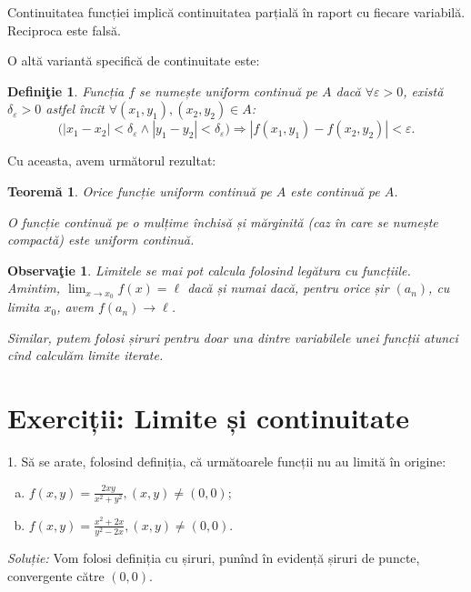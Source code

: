 \documentclass[11pt,a4paper]{article}
\newcommand\ds{\displaystyle}
\theoremstyle{dotless}
\newtheorem{theorem}{Teorem\u{a}}[section]
\theoremstyle{dotlessdr}
\newtheorem{definition}{Defini\c{t}ie}[section]
\newtheorem{remark}{Observa\c{t}ie}[section]
\begin{document}
Continuitatea funcției implică continuitatea parțială în raport cu fiecare variabilă. Reciproca
este falsă.

O altă variantă specifică de continuitate este:
\begin{definition}\label{def:uc}
  Funcția $f$ se numește \emph{uniform continuă} pe $A$ dacă $\forall \varepsilon > 0$, există
  $\delta_\varepsilon > 0$ astfel încît $\forall (x_1, y_1), (x_2, y_2) \in A$:
  \[
    \big( | x_1 - x_2 | < \delta_\varepsilon \land | y_1 - y_2 | < \delta_\varepsilon \big) %
    \Rightarrow | f(x_1, y_1) - f(x_2, y_2) | < \varepsilon.
  \]
\end{definition}

Cu aceasta, avem următorul rezultat:

\begin{theorem}\label{thm:uc-c}
  Orice funcție uniform continuă pe $A$ este continuă pe $A$.

  O funcție continuă pe o mulțime închisă și mărginită (caz în care se numește \emph{compactă})
  este uniform continuă.
\end{theorem}

\begin{remark}\label{rk:siruri-limite}
  Limitele se mai pot calcula folosind legătura cu funcțiile. Amintim, $\ds\lim_{x \to x_0} f(x) = \ell$
  dacă și numai dacă, pentru orice șir $(a_n)$, cu limita $x_0$, avem $f(a_n) \to \ell$.

  Similar, putem folosi șiruri pentru doar una dintre variabilele unei funcții atunci cînd
  calculăm limite iterate.
\end{remark}


\section{Exerciții: Limite și continuitate}
\label{sec:ex-lim-cont}

1. Să se arate, folosind definiția, că următoarele funcții nu au limită în origine:
\begin{enumerate}[(a)]
\item $f(x, y) = \frac{2xy}{x^2 + y^2}, (x, y) \neq (0, 0)$;
\item $f(x, y) = \frac{x^2 + 2x}{y^2 - 2x}, (x, y) \neq (0, 0)$.
\end{enumerate}

\emph{Soluție:} Vom folosi definiția cu șiruri, punînd în evidență șiruri de puncte,
convergente către $(0, 0)$.
\end{document}
